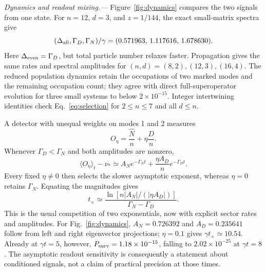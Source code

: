 \documentclass[aps,pra,reprint,superscriptaddress,nofootinbib]{revtex4-2}
\begin{document}
\emph{Dynamics and readout mixing.---}
Figure~\ref{fig:dynamics} compares the two signals from one state. For $n=12$, $d=3$, and $z=1/144$, the exact small-matrix spectra give
\begin{equation}
(\Delta_{\rm all},\Gamma_D,\Gamma_N)/\gamma
=(0.571963,\,1.117616,\,1.678630).
\label{eq:numbers}
\end{equation}
Here $\Delta_{\rm even}=\Gamma_D$, but total particle number relaxes faster. Propagation gives the same rates and spectral amplitudes for $(n,d)=(8,2),(12,3),(16,4)$. The reduced population dynamics retain the occupations of two marked modes and the remaining occupation count; they agree with direct full-superoperator evolution for three small systems to below $2\times10^{-15}$. Integer intertwining identities check Eq.~\eqref{eq:selection} for $2\le n\le7$ and all $d\le n$.

A detector with unequal weights on modes 1 and 2 measures
\begin{equation}
O_\eta=\frac{\hat N}{n}+\eta\frac{D}{n}.
\end{equation}
Whenever $\Gamma_D<\Gamma_N$ and both amplitudes are nonzero,
\begin{equation}
\langle O_\eta\rangle_t-\nu_*\simeq
 A_N e^{-\Gamma_Nt}+\frac{\eta A_D}{n}e^{-\Gamma_Dt}.
\label{eq:readout}
\end{equation}
Every fixed $\eta\ne0$ then selects the slower asymptotic exponent, whereas $\eta=0$ retains $\Gamma_N$. Equating the magnitudes gives
\begin{equation}
t_\times\simeq\frac{\ln[n|A_N|/(|\eta A_D|)]}{\Gamma_N-\Gamma_D}.
\label{eq:cross}
\end{equation}
This is the usual competition of two exponentials, now with explicit sector rates and amplitudes. For Fig.~\ref{fig:dynamics}, $A_N=0.726392$ and $A_D=0.235641$ follow from left and right eigenvector projections; $\eta=0.1$ gives $\gamma t_\times\simeq10.54$. Already at $\gamma t=5$, however, $P_{\rm surv}=1.18\times10^{-15}$, falling to $2.02\times10^{-25}$ at $\gamma t=8$. The asymptotic readout sensitivity is consequently a statement about conditioned signals, not a claim of practical precision at those times.
\end{document}
